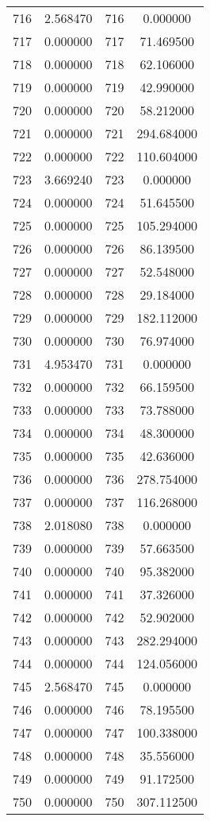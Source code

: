 \documentclass[12pt]{article}
\begin{document}
\begin{longtable}{@{}cccc@{}}
716 & 2.568470 & 716 & 0.000000 \\
717 & 0.000000 & 717 & 71.469500 \\
718 & 0.000000 & 718 & 62.106000 \\
719 & 0.000000 & 719 & 42.990000 \\
720 & 0.000000 & 720 & 58.212000 \\
721 & 0.000000 & 721 & 294.684000 \\
722 & 0.000000 & 722 & 110.604000 \\
723 & 3.669240 & 723 & 0.000000 \\
724 & 0.000000 & 724 & 51.645500 \\
725 & 0.000000 & 725 & 105.294000 \\
726 & 0.000000 & 726 & 86.139500 \\
727 & 0.000000 & 727 & 52.548000 \\
728 & 0.000000 & 728 & 29.184000 \\
729 & 0.000000 & 729 & 182.112000 \\
730 & 0.000000 & 730 & 76.974000 \\
731 & 4.953470 & 731 & 0.000000 \\
732 & 0.000000 & 732 & 66.159500 \\
733 & 0.000000 & 733 & 73.788000 \\
734 & 0.000000 & 734 & 48.300000 \\
735 & 0.000000 & 735 & 42.636000 \\
736 & 0.000000 & 736 & 278.754000 \\
737 & 0.000000 & 737 & 116.268000 \\
738 & 2.018080 & 738 & 0.000000 \\
739 & 0.000000 & 739 & 57.663500 \\
740 & 0.000000 & 740 & 95.382000 \\
741 & 0.000000 & 741 & 37.326000 \\
742 & 0.000000 & 742 & 52.902000 \\
743 & 0.000000 & 743 & 282.294000 \\
744 & 0.000000 & 744 & 124.056000 \\
745 & 2.568470 & 745 & 0.000000 \\
746 & 0.000000 & 746 & 78.195500 \\
747 & 0.000000 & 747 & 100.338000 \\
748 & 0.000000 & 748 & 35.556000 \\
749 & 0.000000 & 749 & 91.172500 \\
750 & 0.000000 & 750 & 307.112500 \\

\end{longtable}
\end{document}
